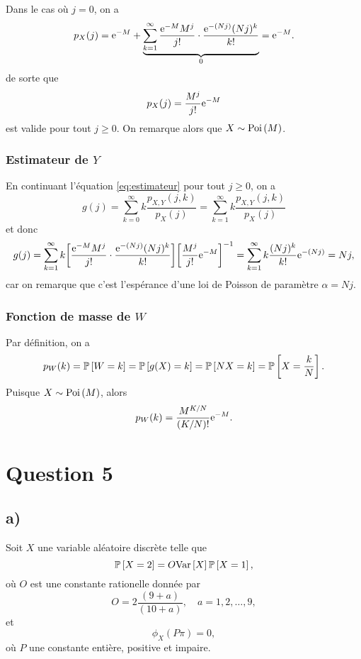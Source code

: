 \documentclass[11pt]{article}
\renewcommand\P[1]{%
	\ensuremath{%
		\mathbb{P}\left[#1\right]%
	}%
}%
\newcommand\Var[1]{%
	\ensuremath{%
		\mathrm{Var}\left[#1\right]%
	}%
}%
\newcommand\Poi[1]{%
	\ensuremath{%
		\mathrm{Poi}\left(#1\right)%
	}%
}%
\newcommand\e{%
    \ensuremath{%
        \mathrm{e}%
    }%
}
\begin{document}
Dans le cas où $j=0$, on a
\begin{equation*}
    p_X(j)
    =\e^{-M}+\underbrace{\sum_{k=1}^\infty\frac{\e^{-M}M^j}{j!}
        \cdot\frac{\e^{-(Nj)}(Nj)^k}{k!}}_{0}
    =\e^{-M}.
\end{equation*}
de sorte que
\begin{equation*}
    p_X(j)
    =\frac{M^j}{j!}\e^{-M}
\end{equation*}
est valide pour tout $j\geq 0$. On remarque alors que $X\sim\Poi{M}$.

\subsubsection*{Estimateur de \boldmath $Y$}
En continuant l'équation \eqref{eq:estimateur} pour tout $j\geq 0$, on a
\begin{equation*}
    g(j)
    =\sum_{k=0}^\infty k\frac{p_{X,Y}(j,k)}{p_X(j)}
    =\sum_{k=1}^\infty k\frac{p_{X,Y}(j,k)}{p_X(j)}
\end{equation*}
et donc
\begin{equation*}
    g(j)
    =\sum_{k=1}^\infty k\bigg[
        \frac{\e^{-M}M^j}{j!}\cdot\frac{\e^{-(Nj)}(Nj)^k}{k!}
    \bigg]\bigg[
        \frac{M^j}{j!}\e^{-M}
    \bigg]^{-1}
    =\sum_{k=1}^\infty k
        \frac{(Nj)^k}{k!}\e^{-(Nj)}
    =Nj,
\end{equation*}
car on remarque que c'est l'espérance d'une loi de Poisson de paramètre
$\alpha=Nj$.

\subsubsection*{Fonction de masse de \boldmath $W$}
Par définition, on a
\begin{equation*}
    p_W(k)
    =\P{W=k}
    =\P{g(X)=k}
    =\P{NX=k}
    =\P{X=\frac{k}{N}}.
\end{equation*}
Puisque $X\sim\Poi{M}$, alors
\begin{equation*}
    p_W(k)
    =\frac{M^{K/N}}{(K/N)!}\e^{-M}.
\end{equation*}

\pagebreak
\section*{Question 5}
\subsection{a)}
Soit $X$ une variable aléatoire discrète telle que
\begin{equation}\label{eq:eq1}
    \P{X=2}=O\Var{X}\P{X=1},
\end{equation}
où $O$ est une constante rationelle donnée par
\begin{equation*}
    O=2\frac{(9+a)}{(10+a)},\quad a=1,2,\dots,9,
\end{equation*}
et
\begin{equation}\label{eq:eq2}
    \phi_X(P\pi)=0,
\end{equation}
où $P$ une constante entière, positive et impaire.
\end{document}
